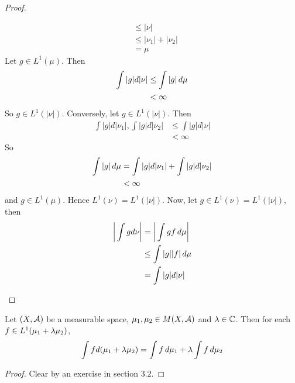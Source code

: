 \documentclass{book}
\begin{document}
\begin{proof}
\begin{enumerate}
\begin{align*}
				&\leq |\nu| \\
				&\leq |\nu_1|+ |\nu_2| \\
				&= \mu
			\end{align*}
			Let $g \in L^1(\mu)$. Then 
			\begin{align*}
				\int |g| d |\nu| 
				&\leq \int |g| \, d \mu \\
				&< \infty
			\end{align*}
			So $g \in L^1(|\nu|)$.
			Conversely, let $g \in L^1(|\nu|)$. Then 
			\begin{align*}
				\int |g| d|\nu_1|, \int |g| d |\nu_2| 
				& \leq \int |g|d |\nu|\\
				& < \infty
			\end{align*}
			So 
			\begin{align*}
				\int |g| \, d \mu
				& =\int |g| d|\nu_1| + \int |g| d |\nu_2| \\
				& < \infty
			\end{align*}
			and $g \in L^1(\mu)$. Hence $L^1(\nu) = L^1(|\nu|)$. 
			Now, let $g \in L^1(\nu) = L^1(|\nu|)$, then 
			\begin{align*}
				\bigg| \int g d\nu \bigg| 
				&= \bigg| \int g f \, d \mu \bigg| \\
				& \leq \int |g||f|\, d \mu\\
				& = \int |g| d |\nu|
			\end{align*}
			
		\end{enumerate}
	\end{proof}


	\begin{ex}  
	Let $(X, \mathcal{A})$ be a measurable space, $\mu_1, \mu_2 \in M(X, \mathcal{A})$ and $\lambda \in \mathbb{C}$. Then for each $f \in L^1(\mu_1 + \lambda \mu_2)$, $$\int f d(\mu_1 + \lambda \mu_2) = \int f \, d \mu_1 + \lambda \int f \, d \mu_2$$
	\end{ex}
	
	\begin{proof}
	Clear by an exercise in section $3.2$.
	\end{proof}

	
\end{document}
